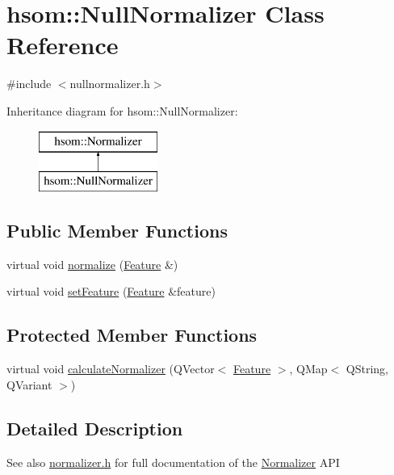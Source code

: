 \hypertarget{classhsom_1_1_null_normalizer}{\section{hsom\-:\-:\-Null\-Normalizer \-Class \-Reference}
\label{classhsom_1_1_null_normalizer}
}


{\ttfamily \#include $<$nullnormalizer.\-h$>$}

\-Inheritance diagram for hsom\-:\-:\-Null\-Normalizer\-:\begin{figure}[H]
\begin{center}
\leavevmode
\includegraphics[height=2.000000cm]{classhsom_1_1_null_normalizer}
\end{center}
\end{figure}
\subsection*{\-Public \-Member \-Functions}
\begin{DoxyCompactItemize}
\item 
virtual void \hyperlink{classhsom_1_1_null_normalizer_a53a02e902af518f06611bf8d787f4832}{normalize} (\hyperlink{classhsom_1_1_feature}{\-Feature} \&)
\item 
virtual void \hyperlink{classhsom_1_1_null_normalizer_aace8f0e20fa4592ad7557a6485361239}{set\-Feature} (\hyperlink{classhsom_1_1_feature}{\-Feature} \&feature)
\end{DoxyCompactItemize}
\subsection*{\-Protected \-Member \-Functions}
\begin{DoxyCompactItemize}
\item 
virtual void \hyperlink{classhsom_1_1_null_normalizer_afa74034fd30d11ee08535078adabb190}{calculate\-Normalizer} (\-Q\-Vector$<$ \hyperlink{classhsom_1_1_feature}{\-Feature} $>$, \-Q\-Map$<$ \-Q\-String, \-Q\-Variant $>$)
\end{DoxyCompactItemize}


\subsection{\-Detailed \-Description}
\begin{DoxySeeAlso}{\-See also}
\hyperlink{normalizer_8h_source}{normalizer.\-h} for full documentation of the \hyperlink{classhsom_1_1_normalizer}{\-Normalizer} \-A\-P\-I 
\end{DoxySeeAlso}


